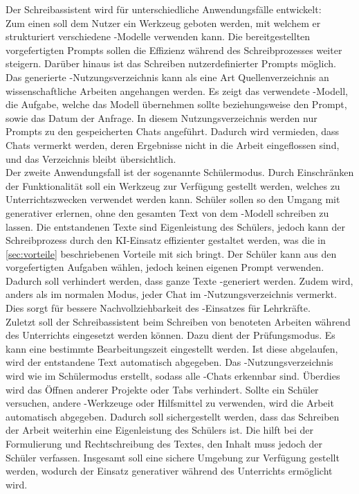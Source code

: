 \documentclass[../main.tex]{subfiles}
\begin{document}
Der Schreibassistent wird für unterschiedliche Anwendungsfälle entwickelt: \\
 Zum einen soll dem Nutzer ein Werkzeug geboten werden, mit welchem er strukturiert verschiedene -Modelle verwenden kann. Die bereitgestellten vorgefertigten Prompts sollen 
 die Effizienz während des Schreibprozesses weiter steigern. Darüber hinaus ist das Schreiben nutzerdefinierter Prompts möglich. Das generierte -Nutzungsverzeichnis kann als eine 
 Art Quellenverzeichnis an wissenschaftliche Arbeiten angehangen werden. Es zeigt das verwendete -Modell, die Aufgabe, welche das Modell übernehmen sollte 
 beziehungsweise den Prompt, sowie das Datum der Anfrage. In diesem Nutzungsverzeichnis werden nur Prompts zu den gespeicherten Chats angeführt. Dadurch wird vermieden, dass Chats 
 vermerkt werden, deren Ergebnisse nicht in die Arbeit eingeflossen sind, und das Verzeichnis bleibt übersichtlich.\\ 
 Der zweite Anwendungsfall ist der sogenannte Schülermodus. Durch 
 Einschränken der Funktionalität soll ein Werkzeug zur Verfügung gestellt werden, welches zu Unterrichtszwecken verwendet werden kann. Schüler sollen so den Umgang mit generativer 
  erlernen, ohne den gesamten Text von dem -Modell schreiben zu lassen. Die entstandenen Texte sind Eigenleistung des Schülers, jedoch kann der 
 Schreibprozess durch den KI-Einsatz effizienter gestaltet werden, was die in \autoref{sec:vorteile} beschriebenen Vorteile mit sich bringt. Der Schüler kann aus den vorgefertigten Aufgaben 
 wählen, jedoch keinen eigenen Prompt verwenden. Dadurch soll verhindert werden, dass ganze Texte -generiert werden. Zudem wird, anders als im normalen Modus, jeder 
 Chat im -Nutzungsverzeichnis vermerkt. Dies sorgt für bessere Nachvollziehbarkeit des -Einsatzes für Lehrkräfte.\\ 
 Zuletzt soll der Schreibassistent 
 beim Schreiben von benoteten Arbeiten während des Unterrichts eingesetzt werden können. Dazu dient der Prüfungsmodus. Es kann eine bestimmte Bearbeitungszeit eingestellt werden. 
 Ist diese abgelaufen, wird der entstandene Text automatisch abgegeben. Das -Nutzungsverzeichnis wird wie im Schülermodus erstellt, sodass alle -Chats 
 erkennbar sind. Überdies  wird das Öffnen anderer Projekte oder Tabs verhindert. Sollte ein Schüler versuchen, andere -Werkzeuge oder Hilfsmittel zu verwenden, 
 wird die Arbeit automatisch abgegeben. Dadurch soll sichergestellt werden, dass das Schreiben der Arbeit weiterhin eine Eigenleistung des Schülers ist. Die  hilft 
 bei der Formulierung und Rechtschreibung des Textes, den Inhalt muss jedoch der Schüler verfassen. Insgesamt soll eine sichere Umgebung zur Verfügung gestellt werden, wodurch der Einsatz 
 generativer  während des Unterrichts ermöglicht wird.
\end{document}
